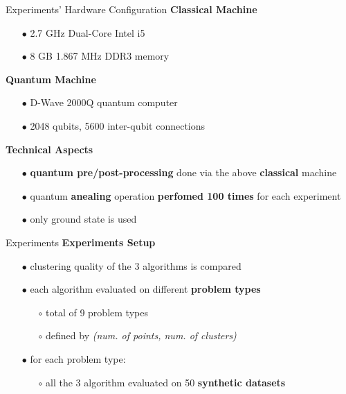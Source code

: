 		\begin{frame}{Experiments' Hardware Configuration}	
			\textbf{Classical Machine}
			\begin{itemize}
				\item[$\bullet$] 2.7 GHz Dual-Core Intel i5 
				\item[$\bullet$] 8 GB 1.867 MHz DDR3 memory 
			\end{itemize}

			\textbf{Quantum Machine}
			\begin{itemize}
				\item[$\bullet$] D-Wave 2000Q quantum computer 
				\item[$\bullet$] 2048 qubits, 5600 inter-qubit connections
			\end{itemize}

			\textbf{Technical Aspects}
			\begin{itemize}
				\item[$\bullet$] \textbf{quantum pre/post-processing} done via the above \textbf{classical} machine
				\item[$\bullet$] quantum \textbf{anealing} operation \textbf{perfomed 100 times} for each experiment   
				\item[$\bullet$] only ground state is used 
			\end{itemize}			


		\end{frame}

		\begin{frame}{Experiments}
			\textbf{Experiments Setup}
			\begin{itemize}
				\item[$\bullet$] clustering quality of the 3 algorithms is compared
				\item[$\bullet$] each algorithm evaluated on different \textbf{problem types}
				\begin{itemize}
					\item[$\circ$] total of 9 problem types 
					\item[$\circ$] defined by \textit{(num. of points, num. of clusters)}
				\end{itemize}
				\item[$\bullet$] for each problem type:
				\begin{itemize}
					\item[$\circ$]  all the 3 algorithm evaluated on 50 \textbf{synthetic datasets}
				\end{itemize}
			\end{itemize}

			
		\end{frame}

